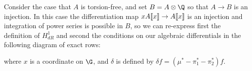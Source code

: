 \begin{example}
Consider the case that \(A\) is torsion-free, and set \(B = A \otimes \Q\) so that \(A \to B\) is an injection.
In this case the differentiation map \(x A\llbracket{x}\rrbracket \to A\llbracket{x}\rrbracket\) is an injection and integration of power series is possible in \(B\), so we can re-express first the definition of \(H^1_{dR}\) and second the conditions on our algebraic differentials in the following diagram of exact rows:
\begin{center}\vspace{-0.8\baselineskip}
\end{center}
where \(x\) is a coordinate on \(\G\), and \(\delta\) is defined by \(\delta f = (\mu^* - \pi_1^* - \pi_2^*)f\).
\end{example}


